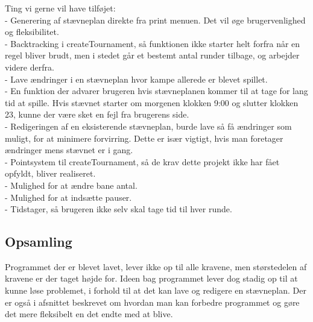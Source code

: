 Ting vi gerne vil have tilføjet:\\
- Generering af stævneplan direkte fra print menuen. Det vil øge brugervenlighed og fleksibilitet.\\
- Backtracking i createTournament, så funktionen ikke starter helt forfra når en regel bliver brudt, men i stedet går et bestemt antal runder tilbage, og arbejder videre derfra.\\
- Lave ændringer i en stævneplan hvor kampe allerede er blevet spillet.\\ 
- En funktion der advarer brugeren hvis stævneplanen kommer til at tage for lang tid at spille. Hvis stævnet starter om morgenen klokken 9:00 og slutter klokken 23, kunne der være sket en fejl fra brugerens side.\\
- Redigeringen af en eksisterende stævneplan, burde lave så få ændringer som muligt, for at minimere forvirring. Dette er især vigtigt, hvis man foretager ændringer mens stævnet er i gang.\\
- Pointsystem til createTournament, så de krav dette projekt ikke har fået opfyldt, bliver realiseret. \\
- Mulighed for at ændre bane antal.\\
- Mulighed for at indsætte pauser.\\
- Tidstager, så brugeren ikke selv skal tage tid til hver runde.\\

\subsection*{Opsamling} 
Programmet der er blevet lavet, lever ikke op til alle kravene, men størstedelen af kravene er der taget højde for. Ideen bag programmet lever dog stadig op til at kunne løse problemet, i forhold til at det kan lave og redigere en stævneplan. Der er også i afsnittet beskrevet om hvordan man kan forbedre programmet og gøre det mere fleksibelt en det endte med at blive.